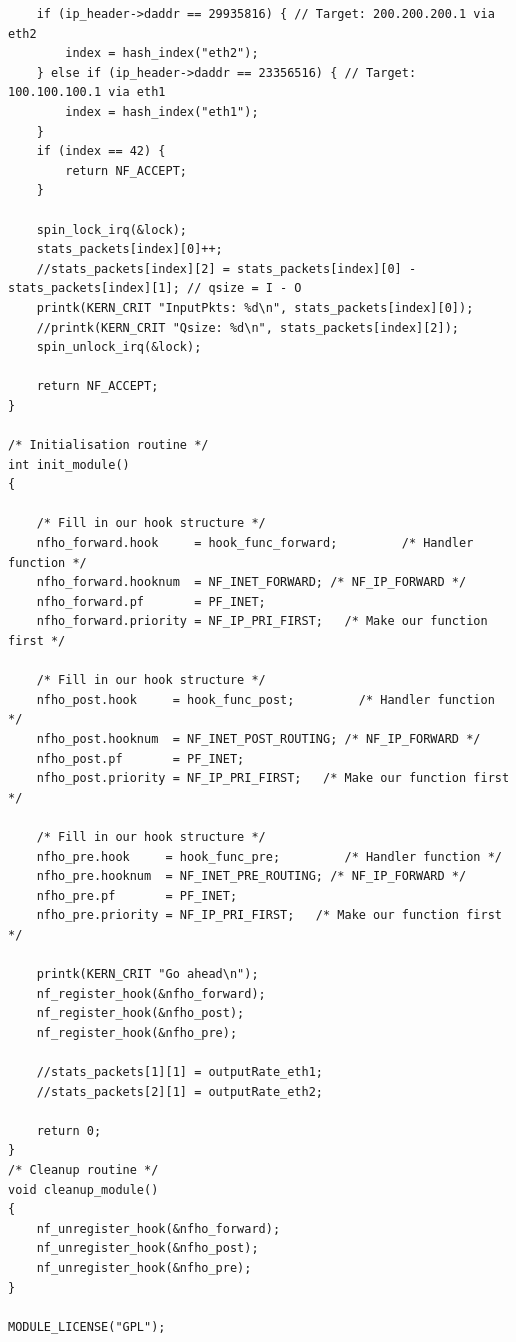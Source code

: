 \documentclass[a4paper]{article}
\begin{document}
\begin{verbatim}
    if (ip_header->daddr == 29935816) { // Target: 200.200.200.1 via eth2
        index = hash_index("eth2");
    } else if (ip_header->daddr == 23356516) { // Target: 100.100.100.1 via eth1
        index = hash_index("eth1");
    }
    if (index == 42) {
        return NF_ACCEPT;
    }
    
    spin_lock_irq(&lock);
    stats_packets[index][0]++;
    //stats_packets[index][2] = stats_packets[index][0] - stats_packets[index][1]; // qsize = I - O
    printk(KERN_CRIT "InputPkts: %d\n", stats_packets[index][0]);
    //printk(KERN_CRIT "Qsize: %d\n", stats_packets[index][2]);
    spin_unlock_irq(&lock);

    return NF_ACCEPT;
}

/* Initialisation routine */
int init_module()
{

    /* Fill in our hook structure */
    nfho_forward.hook     = hook_func_forward;         /* Handler function */
    nfho_forward.hooknum  = NF_INET_FORWARD; /* NF_IP_FORWARD */
    nfho_forward.pf       = PF_INET;
    nfho_forward.priority = NF_IP_PRI_FIRST;   /* Make our function first */

    /* Fill in our hook structure */
    nfho_post.hook     = hook_func_post;         /* Handler function */
    nfho_post.hooknum  = NF_INET_POST_ROUTING; /* NF_IP_FORWARD */
    nfho_post.pf       = PF_INET;
    nfho_post.priority = NF_IP_PRI_FIRST;   /* Make our function first */

    /* Fill in our hook structure */
    nfho_pre.hook     = hook_func_pre;         /* Handler function */
    nfho_pre.hooknum  = NF_INET_PRE_ROUTING; /* NF_IP_FORWARD */
    nfho_pre.pf       = PF_INET;
    nfho_pre.priority = NF_IP_PRI_FIRST;   /* Make our function first */

    printk(KERN_CRIT "Go ahead\n");
    nf_register_hook(&nfho_forward);
    nf_register_hook(&nfho_post);
    nf_register_hook(&nfho_pre);

    //stats_packets[1][1] = outputRate_eth1;
    //stats_packets[2][1] = outputRate_eth2;

    return 0;
}
/* Cleanup routine */
void cleanup_module()
{
    nf_unregister_hook(&nfho_forward);
    nf_unregister_hook(&nfho_post);
    nf_unregister_hook(&nfho_pre);
}

MODULE_LICENSE("GPL");

\end{verbatim}
\end{document}
